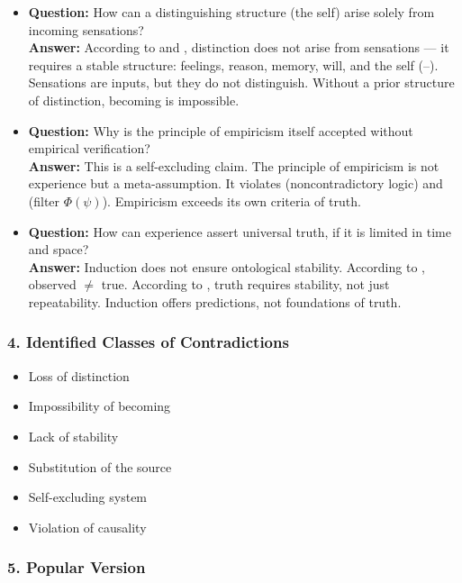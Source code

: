 \documentclass[12pt]{article}
\begin{document}
\begin{itemize}
\item \textbf{Question:} How can a distinguishing structure (the self) arise solely from incoming sensations?  
\\ \textbf{Answer:} According to \text{[9]} and \text{[7]}, distinction does not arise from sensations — it requires a stable structure: feelings, reason, memory, will, and the self (\text{[10.1]}–\text{[10.6]}). Sensations are inputs, but they do not distinguish. Without a prior structure of distinction, becoming is impossible.

\item \textbf{Question:} Why is the principle of empiricism itself accepted without empirical verification?  
\\ \textbf{Answer:} This is a self-excluding claim. The principle of empiricism is not experience but a meta-assumption. It violates \text{[11.1]} (noncontradictory logic) and \text{[11.1.1]} (filter $\Phi(\psi)$). Empiricism exceeds its own criteria of truth.

\item \textbf{Question:} How can experience assert universal truth, if it is limited in time and space?  
\\ \textbf{Answer:} Induction does not ensure ontological stability. According to \text{[5]}, observed $\neq$ true. According to \text{[11.2]}, truth requires stability, not just repeatability. Induction offers predictions, not foundations of truth.
\end{itemize}

\subsubsection*{4. Identified Classes of Contradictions}

\begin{itemize}
\item Loss of distinction
\item Impossibility of becoming
\item Lack of stability
\item Substitution of the source
\item Self-excluding system
\item Violation of causality
\end{itemize}

\subsubsection*{5. Popular Version}
\end{document}

